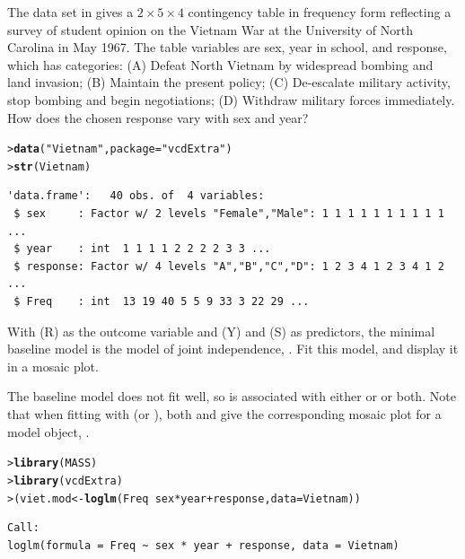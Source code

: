 \documentclass[10pt]{report}\usepackage[]{graphicx}\usepackage[]{color}
\makeatletter
\newcommand{\hlstr}[1]{\textcolor[rgb]{0.192,0.494,0.8}{#1}}%
\newcommand{\hlopt}[1]{\textcolor[rgb]{0,0,0}{#1}}%
\newcommand{\hlstd}[1]{\textcolor[rgb]{0.345,0.345,0.345}{#1}}%
\newcommand{\hlkwb}[1]{\textcolor[rgb]{0.69,0.353,0.396}{#1}}%
\newcommand{\hlkwc}[1]{\textcolor[rgb]{0.333,0.667,0.333}{#1}}%
\newcommand{\hlkwd}[1]{\textcolor[rgb]{0.737,0.353,0.396}{\textbf{#1}}}%
\newenvironment{kframe}{%
 \def\at@end@of@kframe{}%
 \ifinner\ifhmode%
  \def\at@end@of@kframe{\end{minipage}}%
  \begin{minipage}{\columnwidth}%
 \fi\fi%
 \def\FrameCommand##1{\hskip\@totalleftmargin \hskip-\fboxsep
 \colorbox{shadecolor}{##1}\hskip-\fboxsep
     \hskip-\linewidth \hskip-\@totalleftmargin \hskip\columnwidth}%
 \MakeFramed {\advance\hsize-\width
   \@totalleftmargin\z@ \linewidth\hsize
   \@setminipage}}%
 {\par\unskip\endMakeFramed%
 \at@end@of@kframe}
\newenvironment{knitrout}{}{} %
\renewenvironment{knitrout}{\small\renewcommand{\baselinestretch}{.85}}{} %
\makeatother
\begin{document}
\begin{Exercises}
\begin{enumerate*}
    \end{enumerate*}

  \exercise\label{lab:mosaic-vietnam}The data set  in  gives a $2 \times 5 \times 4$ contingency table in frequency form reflecting a survey of student opinion on the Vietnam War at the University of North Carolina in May 1967.  
  The table variables are sex, year in school, and response, which has categories: (A) Defeat North Vietnam by widespread bombing and land invasion; (B) Maintain the present policy; (C) De-escalate military activity, stop bombing and begin negotiations; (D) Withdraw military forces immediately.  How does the chosen response vary with sex and year?
\begin{knitrout}\footnotesize
{}\color{fgcolor}\begin{kframe}
\begin{alltt}
\hlstd{> }\hlkwd{data}\hlstd{(}\hlstr{"Vietnam"}\hlstd{,} \hlkwc{package} \hlstd{=} \hlstr{"vcdExtra"}\hlstd{)}
\hlstd{> }\hlkwd{str}\hlstd{(Vietnam)}
\end{alltt}
\begin{verbatim}
'data.frame':	40 obs. of  4 variables:
 $ sex     : Factor w/ 2 levels "Female","Male": 1 1 1 1 1 1 1 1 1 1 ...
 $ year    : int  1 1 1 1 2 2 2 2 3 3 ...
 $ response: Factor w/ 4 levels "A","B","C","D": 1 2 3 4 1 2 3 4 1 2 ...
 $ Freq    : int  13 19 40 5 5 9 33 3 22 29 ...
\end{verbatim}
\end{kframe}
\end{knitrout}
    \begin{enumerate*}
      \item With  (R) as the outcome variable and  (Y) and  (S) as predictors, the minimal
      baseline \loglin model is the model of joint independence, .  Fit this model, and display it in
      a mosaic plot.
      \begin{ans}
      The baseline model does not fit well, so  is associated with either  or 
      or both.  Note that when fitting with  (or ), both  and 
      give the corresponding mosaic plot for a model object, .
\begin{knitrout}\footnotesize
{}\color{fgcolor}\begin{kframe}
\begin{alltt}
\hlstd{> }\hlkwd{library}\hlstd{(MASS)}
\hlstd{> }\hlkwd{library}\hlstd{(vcdExtra)}
\hlstd{> }\hlstd{(viet.mod} \hlkwb{<-} \hlkwd{loglm}\hlstd{(Freq} \hlopt{~} \hlstd{sex} \hlopt{*} \hlstd{year} \hlopt{+} \hlstd{response,} \hlkwc{data}\hlstd{=Vietnam))}
\end{alltt}
\begin{verbatim}
Call:
loglm(formula = Freq ~ sex * year + response, data = Vietnam)


\end{verbatim}
\end{kframe}
\end{knitrout}
\end{ans}
\end{enumerate*}
\end{Exercises}
\end{document}
